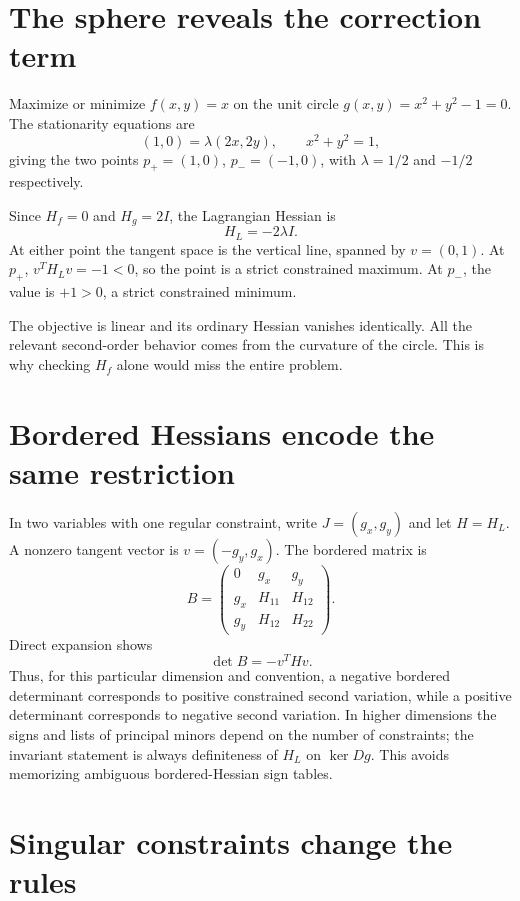 \section{The sphere reveals the correction term}

Maximize or minimize \(f(x,y)=x\) on the unit circle \(g(x,y)=x^2+y^2-1=0\). The stationarity equations are
\[
 (1,0)=\lambda(2x,2y),\qquad x^2+y^2=1,
\]
giving the two points \(p_+=(1,0)\), \(p_-=(-1,0)\), with \(\lambda=1/2\) and \(-1/2\) respectively.

Since \(H_f=0\) and \(H_g=2I\), the Lagrangian Hessian is
\[
 H_L=-2\lambda I.
\]
At either point the tangent space is the vertical line, spanned by \(v=(0,1)\). At \(p_+\), \(v^TH_Lv=-1<0\), so the point is a strict constrained maximum. At \(p_-\), the value is \(+1>0\), a strict constrained minimum.

The objective is linear and its ordinary Hessian vanishes identically. All the relevant second-order behavior comes from the curvature of the circle. This is why checking \(H_f\) alone would miss the entire problem.

\section{Bordered Hessians encode the same restriction}

In two variables with one regular constraint, write \(J=(g_x,g_y)\) and let \(H=H_L\). A nonzero tangent vector is \(v=(-g_y,g_x)\). The bordered matrix is
\[
 B=\begin{pmatrix}
 0&g_x&g_y\\
 g_x&H_{11}&H_{12}\\
 g_y&H_{12}&H_{22}
 \end{pmatrix}.
\]
Direct expansion shows
\[
 \boxed{\det B=-v^THv.}
\]
Thus, for this particular dimension and convention, a negative bordered determinant corresponds to positive constrained second variation, while a positive determinant corresponds to negative second variation. In higher dimensions the signs and lists of principal minors depend on the number of constraints; the invariant statement is always definiteness of \(H_L\) on \(\ker Dg\). This avoids memorizing ambiguous bordered-Hessian sign tables.

\section{Singular constraints change the rules}

